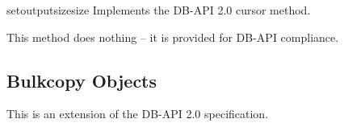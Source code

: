 \begin{methoddesc}[Cursor]{setoutputsize}{size }
Implements the DB-API 2.0 cursor  method.

This method does nothing -- it is provided for DB-API compliance.
\end{methoddesc}

\subsection{Bulkcopy Objects}

This is an extension of the DB-API 2.0 specification.

